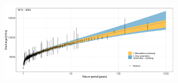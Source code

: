 \documentclass[11pt]{article}
\begin{document}
        
        \begin{figure}[p]
            \centering
            \begin{subfigure}{0.99\textwidth}
                \centering
                \includegraphics[width=1\linewidth]{Figs/10-GeV_205years.pdf}
                \caption{}
                \label{subfig:GEV205y}
            \end{subfigure}
            

\end{figure}
\end{document}

